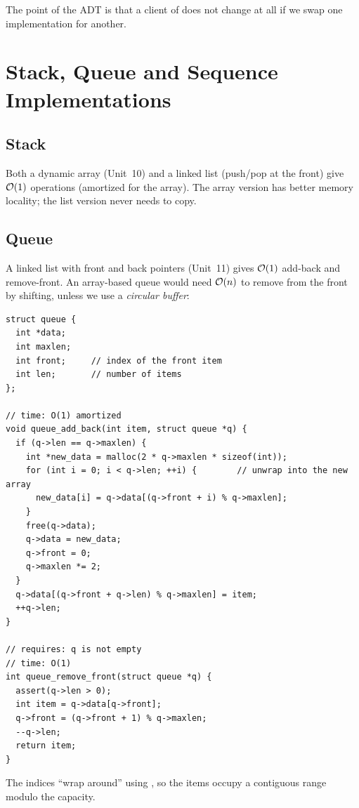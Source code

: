 The point of the ADT is that a client of  does not change at all if we swap
one implementation for another.

\section{Stack, Queue and Sequence Implementations}

\subsection{Stack}

Both a dynamic array (Unit~10) and a linked list (push/pop at the front) give $\mathcal{O}(1)$
operations (amortized for the array). The array version has better memory locality; the list
version never needs to copy.

\subsection{Queue}

A linked list with front and back pointers (Unit~11) gives $\mathcal{O}(1)$ add-back and
remove-front. An array-based queue would need $\mathcal{O}(n)$ to remove from the front by shifting,
unless we use a \emph{circular buffer}:
\begin{lstlisting}[style=c]
struct queue {
  int *data;
  int maxlen;
  int front;     // index of the front item
  int len;       // number of items
};

// time: O(1) amortized
void queue_add_back(int item, struct queue *q) {
  if (q->len == q->maxlen) {
    int *new_data = malloc(2 * q->maxlen * sizeof(int));
    for (int i = 0; i < q->len; ++i) {        // unwrap into the new array
      new_data[i] = q->data[(q->front + i) % q->maxlen];
    }
    free(q->data);
    q->data = new_data;
    q->front = 0;
    q->maxlen *= 2;
  }
  q->data[(q->front + q->len) % q->maxlen] = item;
  ++q->len;
}

// requires: q is not empty
// time: O(1)
int queue_remove_front(struct queue *q) {
  assert(q->len > 0);
  int item = q->data[q->front];
  q->front = (q->front + 1) % q->maxlen;
  --q->len;
  return item;
}
\end{lstlisting}
The indices ``wrap around'' using \code{\%}, so the items occupy a contiguous range modulo the
capacity.


